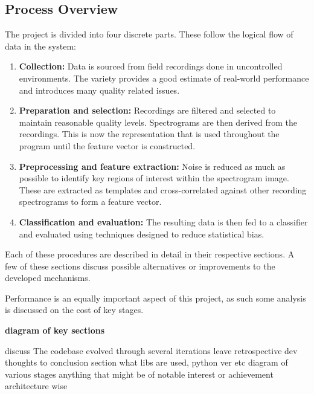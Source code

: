 \subsection{Process Overview}
The project is divided into four discrete parts.
These follow the logical flow of data in the system:
\begin{enumerate}
  \item \textbf{Collection:}
    Data is sourced from field recordings done in uncontrolled environments.
    The variety provides a good estimate of real-world performance and
    introduces many quality related issues.

  \item \textbf{Preparation and selection:}
    Recordings are filtered and selected to maintain reasonable quality levels.
    Spectrograms are then derived from the recordings.
    This is now the representation that is used throughout the program until
    the feature vector is constructed.

  \item \textbf{Preprocessing and feature extraction:}
    Noise is reduced as much as possible to identify key regions of interest
    within the spectrogram image.
    These are extracted as templates and cross-correlated against other
    recording spectrograms to form a feature vector.

  \item \textbf{Classification and evaluation:}
    The resulting data is then fed to a classifier and evaluated using techniques
    designed to reduce statistical bias.
\end{enumerate}

Each of these procedures are described in detail in their respective sections.
A few of these sections discuss possible alternatives or improvements to the
developed mechanisms.

Performance is an equally important aspect of this project, as such some
analysis is discussed on the cost of key stages.


\textbf{diagram of key sections}

discuss The codebase evolved through several iterations 
leave retrospective dev thoughts to conclusion section
what libs are used, python ver etc
diagram of various stages
anything that might be of notable interest or achievement architecture wise
